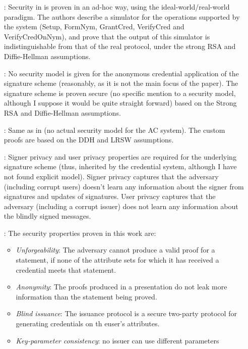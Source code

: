 \begin{enumerate}
\item[\cite{cl01}:] Security in \cite{cl01} is proven in an ad-hoc way,
  using the ideal-world/real-world paradigm. The authors describe a
  simulator for the operations supported by the system (Setup, FormNym,
  GrantCred, VerifyCred and VerifyCredOnNym), and prove that the output of this
  simulator is indistinguishable from that of the real protocol, under the
  strong RSA and Diffie-Hellman assumptions.  
\item[\cite{cl02}:] No security model is given for the anonymous credential
  application of the signature scheme (reasonably, as it is not the main focus
  of the paper). The signature scheme is proven secure (no specific mention
  to a security model, although I suppose it would be quite straight forward)
  based on the Strong RSA and Diffie-Hellman assumptions.
\item[\cite{cl04}:] Same as in \cite{cl02} (no actual security model for the
  AC system). The custom proofs are based on the DDH and LRSW assumptions.
\item[\cite{cks10}:] Signer privacy and user privacy properties are required
  for the underlying signature scheme (thus, inherited by the credential system,
  although I have not found explicit model). Signer privacy captures that the
  adversary (including corrupt users) doesn't learn any information about the
  signer from signatures and updates of signatures. User privacy captures that
  the adversary (including a corrupt issuer) does not learn any information
  about the blindly signed messages. 
\item[\cite{cmz14}:] The security properties proven in this work are:
  \begin{itemize}
  \item \emph{Unforgeability}: The adversary cannot produce a valid proof for a
    statement, if none of the attribute sets for which it has received a
    credential meets that statement.
  \item \emph{Anonymity}: The proofs produced in a presentation do not leak
    more information than the statement being proved.
  \item \emph{Blind issuance}: The issuance protocol is a secure two-party
    protocol for generating credentials on th euser's attributes.
  \item \emph{Key-parameter consistency}: no issuer can use different parameters

\end{itemize}
\end{enumerate}
